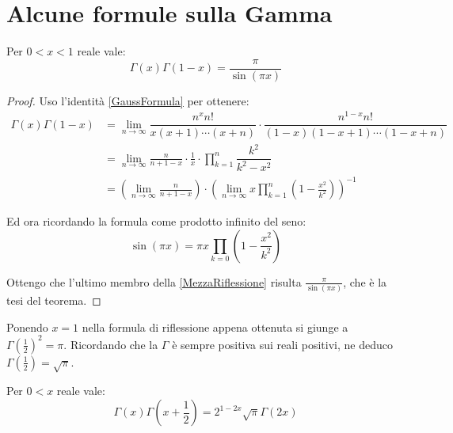 \section{Alcune formule sulla Gamma}

\begin{theorem}
\label{Riflessione}
Per $0<x<1$ reale vale:
\begin{equation*}
	\Gamma(x)\Gamma(1-x)=\frac{\pi}{\sin(\pi x)}
\end{equation*}

\end{theorem}

\begin{proof}
Uso l'identità \cref{GaussFormula} per ottenere:
\begin{equation}
\label{MezzaRiflessione}
\begin{split}
\Gamma(x)\Gamma(1-x) & = \lim_{n\to\infty} \dfrac{n^xn!}{x(x+1)\cdots (x+n)} \cdot \dfrac{n^{1-x}n!}{(1-x)(1-x+1)\cdots (1-x+n)}\\
 & =\lim_{n\to\infty} \frac{n}{n+1-x} \cdot \frac{1}{x} \cdot \prod_{k=1}^{n}\dfrac{k^2}{k^2-x^2} \\
  & =\left(\lim_{n\to\infty} \frac{n}{n+1-x} \right) \cdot \left( \lim_{n\to\infty} x \prod_{k=1}^{n}\left(1-\frac{x^2}{k^2}\right) \right)^{-1}
\end{split}
\end{equation}

Ed ora ricordando la formula come prodotto infinito del seno:
\begin{equation*}
	\sin(\pi x)=\pi x \prod_{k=0} \left(1-\frac{x^2}{k^2}\right)
\end{equation*}

Ottengo che l'ultimo membro della \cref{MezzaRiflessione} risulta $\frac{\pi}{\sin(\pi x)}$, che è la tesi del teorema.


\end{proof}

\begin{remark}
Ponendo $x=1$ nella formula di riflessione appena ottenuta si giunge a $\Gamma\left(\frac12\right)^2=\pi$. 
Ricordando che la $\Gamma$ è sempre positiva sui reali positivi, ne deduco $\Gamma\left(\frac12\right)=\sqrt\pi$.
\end{remark}


\begin{theorem}
\label{Duplicazione}
Per $0<x$ reale vale:
\begin{equation*}
	\Gamma(x)\Gamma\left(x+\frac12\right)=2^{1-2x}\sqrt{\pi}\Gamma(2x)
\end{equation*}

\end{theorem}


